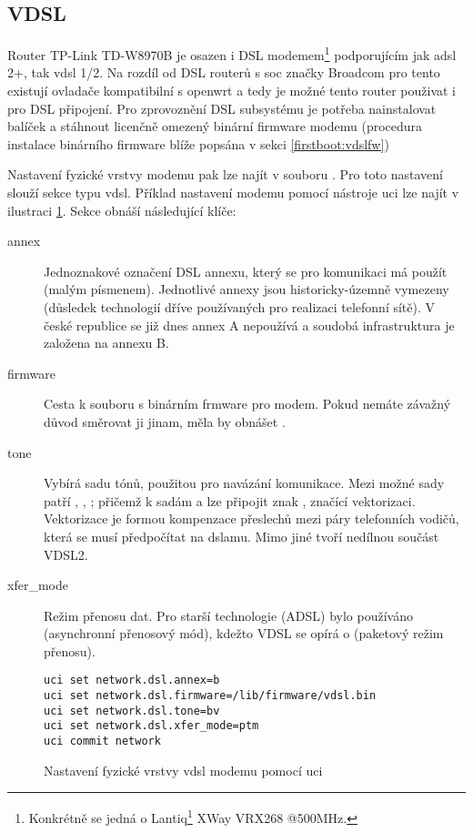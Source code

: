 \subsection{VDSL}
\label{net:vdsl}
Router TP-Link TD-W8970B je osazen i DSL modemem\footnote{
Konkrétně se jedná o Lantiq\footnote{Značka Lantiq dnes vystupuje jako součást značky Intel.}
XWay VRX268 @500MHz.} podporujícím jak \gls{adsl} 2+,
tak \gls{vdsl} 1/2. Na rozdíl od DSL routerů s \gls{soc} značky Broadcom
pro tento existují ovladače kompatibilní s \gls{openwrt} a tedy je možné tento
router použivat i pro DSL připojení. Pro zprovoznění DSL subsystému je potřeba
nainstalovat balíček  a stáhnout licenčně omezený binární
firmware modemu (procedura instalace binárního firmware blíže popsána v
sekci \ref{firstboot:vdslfw})

Nastavení fyzické vrstvy modemu pak lze najít v souboru .
Pro toto nastavení slouží sekce typu vdsl. Příklad nastavení modemu pomocí
nástroje uci lze najít v ilustraci \ref{net:vdsl:phy}. Sekce obnáší následující
klíče:
\begin{description}
\item[annex] Jednoznakové označení DSL annexu, který se pro komunikaci má
použít (malým písmenem). Jednotlivé annexy jsou historicky-územně vymezeny
(důsledek technologií dříve používaných pro realizaci telefonní sítě). V
české republice se již dnes annex A nepoužívá a soudobá infrastruktura je
založena na annexu B.
\item[firmware] Cesta k souboru s binárním frmware pro modem. Pokud nemáte
závažný důvod směrovat ji jinam, měla by obnášet .
\item[tone] Vybírá sadu tónů, použitou pro navázání komunikace. Mezi možné
sady patří , , ; přičemž
k sadám  a  lze připojit znak , značící vektorizaci.
Vektorizace je formou kompenzace přeslechů mezi páry telefonních vodičů,
která se musí předpočítat na \gls{dslam}u. Mimo jiné tvoří nedílnou součást VDSL2.
\item[xfer\_mode] Režim přenosu dat. Pro starší technologie (ADSL) bylo
používáno  (asynchronní přenosový mód), kdežto VDSL se opírá o 
(paketový režim přenosu).
\end{description}
\begin{figure}
\begin{lstlisting}
uci set network.dsl.annex=b
uci set network.dsl.firmware=/lib/firmware/vdsl.bin
uci set network.dsl.tone=bv
uci set network.dsl.xfer_mode=ptm
uci commit network
\end{lstlisting}
\caption{Nastavení fyzické vrstvy \gls{vdsl} modemu pomocí uci}
\label{net:vdsl:phy}
\end{figure}

